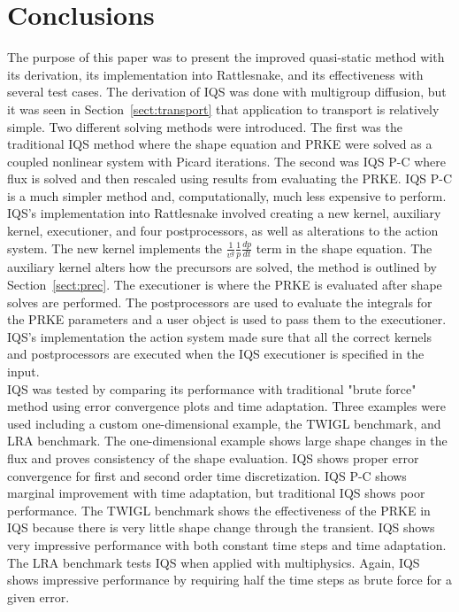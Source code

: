 \documentclass[12pt]{scrartcl}
\newcommand{\sct}[1]{Section~\ref{#1}}                   %
\begin{document}
\section{Conclusions}

The purpose of this paper was to present the improved quasi-static method with its derivation, its implementation into Rattlesnake, and its effectiveness with several test cases.  The derivation of IQS was done with multigroup diffusion, but it was seen in \sct{sect:transport} that application to transport is relatively simple.  Two different solving methods were introduced.  The first was the traditional IQS method where the shape equation and PRKE were solved as a coupled nonlinear system with Picard iterations.  The second was IQS P-C where flux is solved and then rescaled using results from evaluating the PRKE.  IQS P-C is a much simpler method and, computationally, much less expensive to perform. \\

IQS's implementation into Rattlesnake involved creating a new kernel, auxiliary kernel, executioner, and four postprocessors, as well as alterations to the action system.  The new kernel implements the $\frac{1}{v^g}\frac{1}{p}\frac{dp}{dt}$ term in the shape equation.  The auxiliary kernel alters how the precursors are solved, the method is outlined by \sct{sect:prec}.  The executioner is where the PRKE is evaluated after shape solves are performed.  The postprocessors are used to evaluate the integrals for the PRKE parameters and a user object is used to pass them to the executioner.  IQS's implementation the action system made sure that all the correct kernels and postprocessors are executed when the IQS executioner is specified in the input. \\

IQS was tested by comparing its performance with traditional "brute force" method using error convergence plots and time adaptation.  Three examples were used including a custom one-dimensional example, the TWIGL benchmark, and LRA benchmark.  The one-dimensional example shows large shape changes in the flux and proves consistency of the shape evaluation. IQS shows proper error convergence for first and second order time discretization. IQS P-C shows marginal improvement with time adaptation, but traditional IQS shows poor performance.  The TWIGL benchmark shows the effectiveness of the PRKE in IQS because there is very little shape change through the transient.  IQS shows very impressive performance with both constant time steps and time adaptation.  The LRA benchmark tests IQS when applied with multiphysics.  Again, IQS shows impressive performance by requiring half the time steps as brute force for a given error.
\end{document}

